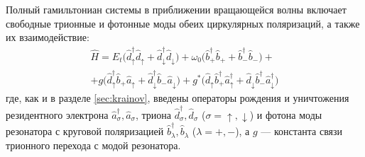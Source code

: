 \documentclass[11pt]{article}    %
\numberwithin{equation}{section}
\begin{document}
Полный гамильтониан системы в приближении вращающейся волны включает
свободные трионные и фотонные моды обеих циркулярных поляризаций, а
также их взаимодействие:
\begin{gather}
    \hat{H} = E_t \bigl( \hat{d}^{\dag}_{\uparrow} \hat{d}_{\uparrow}
    + \hat{d}^{\dag}_{\downarrow} \hat{d}_{\downarrow} \bigr)
    + \omega_0 \bigl( \hat{b}^{\dag}_{+} \hat{b}_{+}
    + \hat{b}^{\dag}_{-} \hat{b}_{-} \bigr) +
    \\ \nonumber
    + g \bigl( \hat{d}^{\dag}_{\uparrow} \hat{b}_{+} \hat{a}_{\uparrow}
    + \hat{d}^{\dag}_{\downarrow} \hat{b}_{-} \hat{a}_{\downarrow} \bigr)
    + g^{*} \bigl( \hat{d}_{\uparrow} \hat{b}^{\dag}_{+} \hat{a}^{\dag}_{\uparrow}
    + \hat{d}_{\downarrow} \hat{b}^{\dag}_{-} \hat{a}^{\dag}_{\downarrow} \bigr)
\end{gather}
где, как и в разделе \ref{sec:krainov}, введены операторы рождения и
уничтожения резидентного электрона
$\hat{a}^{\dag}_{\sigma}, \hat{a}_{\sigma}$, триона
$\hat{d}^{\dag}_{\sigma}, \hat{d}_{\sigma}$
($\sigma = \uparrow, \downarrow$) и фотона моды резонатора с круговой
поляризацией $\hat{b}^{\dag}_{\lambda}, \hat{b}_{\lambda}$
($\lambda = +, -$), а $g$ --- константа связи трионного перехода с
модой резонатора.
\end{document}
